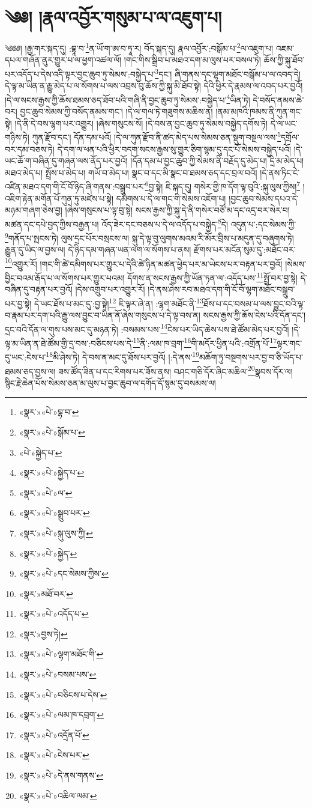 \chapter{༄༅། །རྣལ་འབྱོར་གསུམ་པ་ལ་འཇུག་པ།}༄༅༅། །རྒྱ་གར་སྐད་དུ། :བྷཱ་བ་\footnote{«སྣར་»«པེ་»བྷ་བ་}ན་ཡོ་ག་ཨ་བ་ཏཱ་ར། བོད་སྐད་དུ། རྣལ་འབྱོར་:བསྒོམ་པ་\footnote{«སྣར་»«པེ་»སྒོམ་པ་}ལ་འཇུག་པ། འཇམ་དཔལ་གཞོན་ནུར་གྱུར་པ་ལ་ཕྱག་འཚལ་ལོ། །གང་གིས་སྒྲིབ་པ་མཐའ་དག་མ་ལུས་པར་བསལ་ཏེ། ཆོས་ཀྱི་སྐུ་ཐོབ་པར་འདོད་པ་དེས་འདི་ལྟར་བྱང་ཆུབ་ཏུ་སེམས་:བསྐྱེད་པ་\footnote{«པེ་»སྐྱེད་པ་}དང་། ཞི་གནས་དང་ལྷག་མཐོང་བསྒོམ་པ་ལ་འབད་དེ། དེ་ལྟ་མ་ཡིན་ན་རྒྱུ་མེད་པ་ལ་སོགས་པ་ལས་འབྲས་བུ་ཆོས་ཀྱི་སྐུ་མི་ཐོབ་སྟེ། དེའི་ཕྱིར་དེ་རྣམས་ལ་འབད་པར་བྱའོ། །དེ་ལ་སངས་རྒྱས་ཀྱི་ཆོས་ཐམས་ཅད་ཐོབ་པའི་གཞི་ནི་བྱང་ཆུབ་ཏུ་སེམས་:བསྐྱེད་པ་\footnote{«སྣར་»«པེ་»སྐྱེད་པ་}ཡིན་ཏེ། དེ་བསོད་ནམས་ཆེ་བར། བྱང་ཆུབ་སེམས་ཀྱི་བསོད་ནམས་གང་། །དེ་ལ་གལ་ཏེ་གཟུགས་མཆིས་ན། །ནམ་མཁའི་ཁམས་ནི་ཀུན་གང་སྟེ། །དེ་ནི་དེ་བས་ལྷག་པར་འགྱུར། །ཞེས་གསུངས་སོ། །དེ་བས་ན་བྱང་ཆུབ་ཏུ་སེམས་བསྐྱེད་དགོས་ཏེ། དེ་ལ་ཡང་གཉིས་ཏེ། ཀུན་རྫོབ་དང་། དོན་དམ་པའོ། །དེ་ལ་ཀུན་རྫོབ་ནི་ཚད་མེད་པས་སེམས་ཅན་སྡུག་བསྔལ་ལས་\footnote{«སྣར་»«པེ་»ལ་}དགྲོལ་བར་དམ་བཅས་ཏེ། དེ་དག་ལ་ཕན་པའི་ཕྱིར་བདག་སངས་རྒྱས་སུ་གྱུར་ཅིག་སྙམ་དུ་དང་པོ་སེམས་བསྐྱེད་པའོ། །དེ་ཡང་ཆོ་ག་བཞིན་དུ་གཞན་ལས་ནོད་པར་བྱའོ། །དོན་དམ་པ་བྱང་ཆུབ་ཀྱི་སེམས་ནི་བརྗོད་དུ་མེད་པ། དྲི་མ་མེད་པ། མཐའ་མེད་པ། སྤྲོས་པ་མེད་པ། གཡོ་བ་མེད་པ། སྣང་བ་དང་མི་སྣང་བ་ཐམས་ཅད་དང་བྲལ་བའོ། །དེ་ནས་ཏིང་ངེ་འཛིན་མཐའ་དག་གི་ངོ་བོ་ཉིད་ཞི་གནས་:བསྒྲུབ་པར་\footnote{«སྣར་»«པེ་»སྒྲུབ་པར་}བྱ་སྟེ། ཇི་སྐད་དུ། གསེར་གྱི་ཁ་དོག་ལྟ་བུའི་:སྐུ་ལུས་ཀྱིས།\footnote{«སྣར་»«པེ་»སྐུ་ལུས་ཀྱི།} །འཇིག་རྟེན་མགོན་པོ་ཀུན་ཏུ་མཛེས་པ་སྟེ། དམིགས་པ་དེ་ལ་གང་གི་སེམས་འཇོག་པ། །བྱང་ཆུབ་སེམས་དཔའ་དེ་མཉམ་གཞག་ཅེས་བྱ། །ཞེས་གསུངས་པ་ལྟ་བུ་སྟེ། སངས་རྒྱས་ཀྱི་སྐུ་དེ་ནི་གསེར་བཙོ་མ་དང་འདྲ་བར་སེར་བ། མཚན་དང་དཔེ་བྱད་ཀྱིས་བརྒྱན་པ། འོད་ཟེར་དང་བཅས་པ་དེ་ལ་འདོད་པ་བསྐྱེད་\footnote{«སྣར་»«པེ་»སྐྱེད་}དེ། འདུན་པ་:དང་སེམས་ཀྱི་\footnote{«སྣར་»«པེ་»དང་སེམས་ཀྱིས་}གནོད་པ་སྤངས་ཏེ། ལུས་དྲང་པོར་བསྲངས་ལ། སྐུ་དེ་ལྟ་བུ་ལུགས་མའམ་རི་མོར་བྲིས་པ་མདུན་དུ་བཞུགས་ཏེ། རྒྱུན་དུ་ཡིད་ལ་བྱས་ལ། དེ་ཉིད་དམ་གཞན་ཡན་ལག་ལ་སོགས་པ་ནས། རྫོགས་པར་མངོན་སུམ་དུ་:མཐོང་བར་\footnote{«སྣར་»མཐོ་བར་}འགྱུར་རོ། །གང་གི་ཚེ་དམིགས་པར་གྱུར་པ་དེའི་ཚེ་ཉིན་མཚན་ཕྱེད་པར་མ་ཡེངས་པར་བརྟན་པར་བྱའོ། །སེམས་བྱིང་བའམ་རྒོད་པ་ལ་སོགས་པར་གྱུར་པའམ། དོགས་ན་སངས་རྒྱས་ཀྱི་ཡོན་ཏན་ལ་:འདོད་པས་\footnote{«སྣར་»«པེ་»འདོད་པ་}སྤྲོ་བར་བྱ་སྟེ། དེ་བཞིན་དུ་བརྟན་པར་བྱའོ། །དེས་འགྲུབ་པར་འགྱུར་རོ། །དེ་ནས་ཤེས་རབ་མཐའ་དག་གི་ངོ་བོ་ལྷག་མཐོང་བསྒྲུབ་པར་བྱ་སྟེ། དེ་ཡང་ཐོས་པ་མང་དུ་:བྱ་སྟེ།\footnote{«སྣར་»བྱས་ཏེ།} ཇི་ལྟར་ཞེ་ན། :ལྷག་མཐོང་ནི་\footnote{«སྣར་»«པེ་»ལྷག་མཐོང་གི་}ཐོས་པ་དང་བསམ་པ་ལས་བྱུང་བའི་ལྟ་བ་རྣམ་པར་དག་པའི་རྒྱུ་ལས་བྱུང་བ་ཡིན་ནོ་ཞེས་གསུངས་པ་དེ་ལྟ་བས་ན། སངས་རྒྱས་ཀྱི་ཆོས་ངེས་པའི་དོན་དང་། དྲང་བའི་དོན་ལ་གུས་པས་མང་དུ་མཉན་ཏེ། :བསམས་པས་\footnote{«སྣར་»«པེ་»བསམ་པས་}ངེས་པར་ཡིད་ཆེས་པས་ཐེ་ཚོམ་མེད་པར་བྱའོ། །དེ་ལྟ་མ་ཡིན་ན་ཐེ་ཚོམ་གྱི་དྲ་བས་:བཅིངས་པས་དེ་\footnote{«སྣར་»«པེ་»བཅིངས་པ་དེས་}ནི་:ལམ་ཁ་བྲག་\footnote{«སྣར་»«པེ་»ལམ་ཁ་དབྲག་}གི་མདོར་ཕྱིན་པའི་:འགྲོན་པོ་\footnote{«སྣར་»«པེ་»འདྲོན་པོ་}ལྟར་གང་དུ་ཡང་:ངེས་པ་\footnote{«སྣར་»«པེ་»ངེས་པར་}མི་ཤེས་ཏེ། དེ་བས་ན་མང་དུ་ཐོས་པར་བྱའོ། །:དེ་ནས་\footnote{«སྣར་»«པེ་»དེ་ནས་གནས་}མཆོག་ཏུ་བསྔགས་པར་བྱ་བ་ཅི་ཡོད་པ་ཐམས་ཅད་བྱས་ལ། ཟས་ཚོད་ཟིན་པ་དང་རིགས་པར་ཟོས་ནས། བཤང་གཅི་དོར་ཞིང་མཆིལ་\footnote{«སྣར་»«པེ་»འཆིལ་ལམ་}སྣབས་དོར་ལ། སྙིང་རྗེ་ཆེན་པོས་སེམས་ཅན་མ་ལུས་པ་བྱང་ཆུབ་ལ་དགོད་དོ་སྙམ་དུ་བསམས་ལ། 